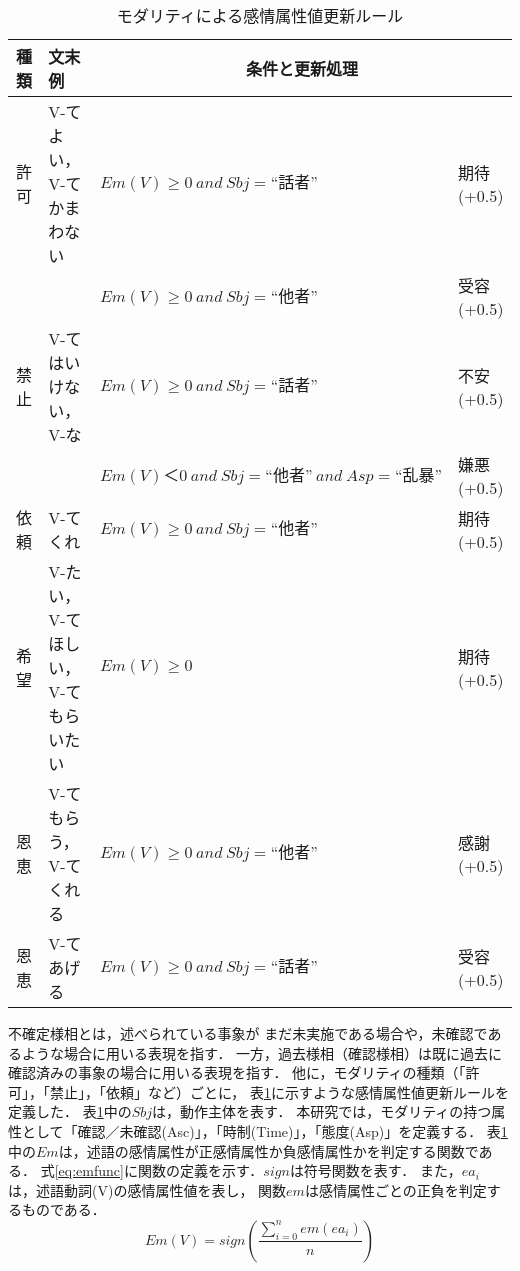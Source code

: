 \documentclass[japanese]{jnlp_1.3c}
\begin{document}
\begin{table}[b]
\begin{center}
\caption{モダリティによる感情属性値更新ルール}
\begin{tabular}{|c|p{4cm}|p{7cm}|l|}
\hline
種類	& 文末例 &	\multicolumn{2}{|c|}{条件と更新処理} \\ \hline \hline
許可			& V-てよい，V-てかまわない   &	 $Em(V) \geq 0 \ and \ Sbj =“話者”$  &  期待 (+0.5) \\ \cline{3-4}
			&    &	$Em(V) \geq 0 \ and \ Sbj =“他者”$	& 受容 (+0.5) \\ \hline
禁止			& V-てはいけない，V-な   &	$Em(V) \geq 0 \ and \ Sbj =“話者”$	&  不安 (+0.5) \\ \cline{3-4}
			&    &	$Em(V) ＜ 0 \ and \ Sbj =“他者”\ and \ Asp =“乱暴”$		&  嫌悪 (+0.5) \\ \hline
依頼			& V-てくれ 	&  $Em(V) \geq 0 \ and \ Sbj =“他者”$		& 期待 (+0.5) \\ \hline
希望			& V-たい，V-てほしい，V-てもらいたい &  $Em(V) \geq 0 $  	& 期待 (+0.5) \\ \hline
恩恵			& V-てもらう，V-てくれる	&  $Em(V) \geq 0 \ and \ Sbj =“他者”$	& 感謝 (+0.5) \\ \hline
恩恵			& V-てあげる	& $Em(V) \geq 0 \ and \ Sbj =“話者”$ & 受容 (+0.5) \\ \hline
\end{tabular}
\label{tb:modality}
\end{center}
\end{table}

不確定様相とは，述べられている事象が
まだ未実施である場合や，未確認であるような場合に用いる表現を指す．
一方，過去様相（確認様相）は既に過去に確認済みの事象の場合に用いる表現を指す．
他に，モダリティの種類（「許可」，「禁止」，「依頼」など）ごとに，
表\ref{tb:modality}に示すような感情属性値更新ルールを定義した．
表\ref{tb:modality}中の$Sbj$は，動作主体を表す．
本研究では，モダリティの持つ属性として「確認／未確認(Asc)」，「時制(Time)」，「態度(Asp)」を定義する．
表\ref{tb:modality}中の$Em$は，述語の感情属性が正感情属性か負感情属性かを判定する関数である．
式\ref{eq:emfunc}に関数の定義を示す．$sign$は符号関数を表す．
また，$ea_i$ は，述語動詞(V)の感情属性値を表し，
\pagebreak
関数$em$は感情属性ごとの正負を判定するものである．
\begin{equation}
\label{eq:emfunc}
Em(V) = sign \left( \frac{ \sum^{n}_{i=0}em(ea_i) }{n} \right) 
\end{equation} 
\end{document}

